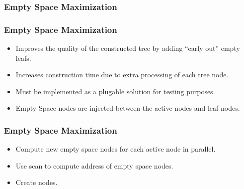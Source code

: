 \documentclass{beamer}
\begin{document}
\subsubsection{Empty Space Maximization}
\begin{frame}
  \frametitle{Empty Space Maximization}
  \begin{itemize}
  \item Improves the quality of the constructed tree by adding ``early out''
    empty leafs.
  \item Increases construction time due to extra processing of each tree node.
  \item Must be implemented as a plugable solution for testing purposes.
  \item Empty Space nodes are injected between the active nodes and leaf nodes.
  \end{itemize}
\end{frame}

\begin{frame}
  \frametitle{Empty Space Maximization}

  \begin{itemize}
  \item Compute new empty space nodes for each active node in parallel.
  \item Use scan to compute address of empty space nodes.
  \item Create nodes.
  \end{itemize}
\end{frame}
\end{document}
